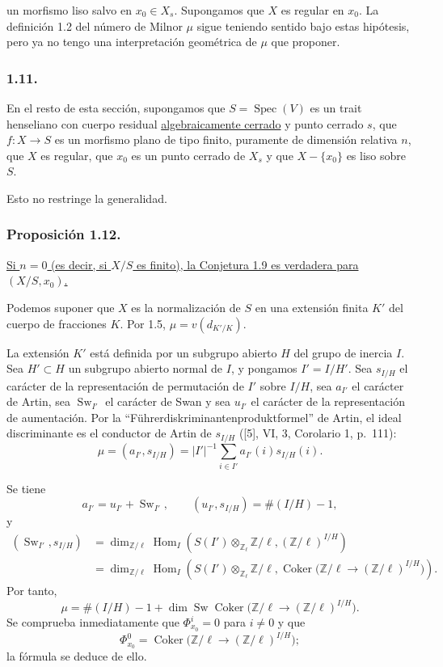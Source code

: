 \pageoriginale

un morfismo liso salvo en $x_0\in X_s$. Supongamos que $X$ es regular
en $x_0$. La definición 1.2 del número de Milnor $\mu$ sigue teniendo
sentido bajo estas hipótesis, pero ya no tengo una interpretación
geométrica de $\mu$ que proponer.

\subsubsection*{1.11.}
En el resto de esta sección, supongamos que
$S=\operatorname{Spec}(V)$ es un trait henseliano con cuerpo residual
\underline{algebraicamente cerrado} y punto cerrado $s$, que
$f:X\to S$ es un morfismo plano de tipo finito, puramente de dimensión
relativa $n$, que $X$ es regular, que $x_0$ es un punto cerrado de
$X_s$ y que $X-\{x_0\}$ es liso sobre $S$.

Esto no restringe la generalidad.

\subsubsection*{Proposición 1.12.}
\underline{Si $n=0$ (es decir, si $X/S$ es finito), la Conjetura 1.9
es verdadera para $(X/S,x_0)$.}

Podemos suponer que $X$ es la normalización de $S$ en una extensión
finita $K'$ del cuerpo de fracciones $K$. Por 1.5,
$\mu=v(d_{K'/K})$.

La extensión $K'$ está definida por un subgrupo abierto $H$ del grupo
de inercia $I$. Sea $H'\subset H$ un subgrupo abierto normal de $I$,
y pongamos $I'=I/H'$. Sea $s_{I/H}$ el carácter de la representación
de permutación de $I'$ sobre $I/H$, sea $a_{I'}$ el carácter de Artin,
sea $\operatorname{Sw}_{I'}$ el carácter de Swan y sea $u_{I'}$ el
carácter de la representación de aumentación. Por la
``Führerdiskriminantenproduktformel'' de Artin, el ideal discriminante
es el conductor de Artin de $s_{I/H}$ ([5], VI, 3, Corolario 1,
p.~111):
\[
\mu=(a_{I'},s_{I/H})
=|I'|^{-1}\sum_{i\in I'}a_{I'}(i)s_{I/H}(i).
\]

\pageoriginale

Se tiene
\[
a_{I'}=u_{I'}+\operatorname{Sw}_{I'},
\qquad
(u_{I'},s_{I/H})=\#(I/H)-1,
\]
y
\begin{align*}
(\operatorname{Sw}_{I'},s_{I/H})
&=\dim_{\mathbb Z/\ell}\operatorname{Hom}_I\!\left(
S(I')\otimes_{\mathbb Z_\ell}\mathbb Z/\ell,
(\mathbb Z/\ell)^{I/H}\right)\\
&=\dim_{\mathbb Z/\ell}\operatorname{Hom}_I\!\left(
S(I')\otimes_{\mathbb Z_\ell}\mathbb Z/\ell,
\operatorname{Coker}\bigl(
\mathbb Z/\ell\longrightarrow(\mathbb Z/\ell)^{I/H}\bigr)
\right).
\end{align*}
Por tanto,
\[
\mu=\#(I/H)-1+
\dim\operatorname{Sw}\operatorname{Coker}\bigl(
\mathbb Z/\ell\longrightarrow(\mathbb Z/\ell)^{I/H}\bigr).
\]
Se comprueba inmediatamente que
$\Phi^i_{x_0}=0$ para $i\ne0$ y que
\[
\Phi^0_{x_0}=\operatorname{Coker}\bigl(
\mathbb Z/\ell\longrightarrow(\mathbb Z/\ell)^{I/H}\bigr);
\]
la fórmula se deduce de ello.

